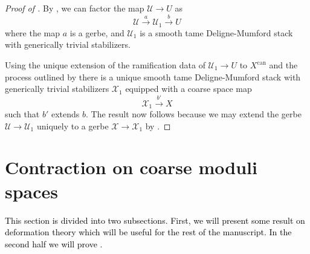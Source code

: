 \documentclass{amsart}
\newcommand{\cU}{\mathcal{U}}
\newcommand{\cX}{\mathcal{X}}
\theoremstyle{definition}
\begin{document}
 \begin{proof}[Proof of ] 
     By \cite[Ex. A.3]{AOV_tame}, we can factor the map $\cU \to U$ as $$\cU\xrightarrow{a} \cU_1 \xrightarrow{b} U$$
     where the map $a$ is a gerbe, and $\cU_1$ is a smooth tame Deligne-Mumford stack with generically trivial stabilizers.
    

     Using the unique extension of the ramification data of $\cU_1 \to U$ to $X^{\mathrm{can}}$ and the process outlined by \cite[Thm. 1.1]{GS17} there is a unique smooth tame Deligne-Mumford stack with generically trivial stabilizers $\cX_1$ equipped with a coarse space map
     $$\cX_1\xrightarrow{b'} X$$
     such that $b'$ extends $b$. The result now follows because we may extend the gerbe $\cU \to \cU_1$ uniquely to a gerbe $\cX \to \cX_1$ by .  \end{proof}
     



 \section{Contraction on coarse moduli spaces}\label{section_contraction_on_cms}
\textcolor{black}{This section is divided into two subsections. First, we will present some result on deformation theory which will be useful for the rest of the manuscript. In the second half we will prove .}
\end{document}
